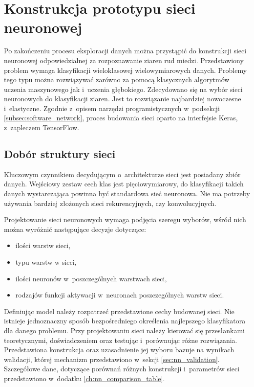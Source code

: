 \section{Konstrukcja prototypu sieci neuronowej}
Po zakończeniu procesu eksploracji danych można przystąpić do
konstrukcji sieci neuronowej odpowiedzialnej za rozpoznawanie ziaren rud
miedzi.
Przedstawiony problem wymaga klasyfikacji wieloklasowej wielowymiarowych
danych.
Problemy tego typu można rozwiązywać zarówno za pomocą klasycznych algorytmów
uczenia maszynowego jak i~uczenia głębokiego.
Zdecydowano się na wybór sieci neuronowych do klasyfikacji ziaren.
Jest to rozwiązanie najbardziej nowoczesne i~elastyczne.
Zgodnie z~opisem narzędzi programistycznych w~podsekcji
\ref{subsec:software_network}, proces budowania sieci oparto na interfejsie
Keras, z~zapleczem TensorFlow.

\subsection{Dobór struktury sieci} \label{subsec:nn_build}
Kluczowym czynnikiem decydującym o~architekturze sieci jest posiadany
zbiór danych.
Wejściowy zestaw cech klas jest pięciowymiarowy, do klasyfikacji takich
danych wystarczająca powinna być standardowa sieć neuronowa.
Nie ma potrzeby używania bardziej złożonych sieci rekurencyjnych, czy
konwolucyjnych.

Projektowanie sieci neuronowych wymaga podjęcia szeregu wyborów, wśród nich
można wyróżnić następujące decyzje dotyczące:
\begin{itemize}
	\item ilości warstw sieci,
	\item typu warstw w sieci,
	\item ilości neuronów w~poszczególnych warstwach sieci,
	\item rodzajów funkcji aktywacji w~neuronach poszczególnych warstw sieci.
\end{itemize}
Definiując model należy rozpatrzeć przedstawione cechy budowanej sieci.
Nie istnieje jednoznaczny sposób bezpośredniego określenia najlepszego
klasyfikatora dla danego problemu.
Przy projektowaniu sieci należy kierować się przesłankami teoretycznymi,
doświadczeniem oraz testując i~porównując różne rozwiązania.
Przedstawiona konstrukcja oraz uzasadnienie jej wyboru bazuje na wynikach
walidacji, której mechanizm przedstawiono w~sekcji \ref{sec:nn_validation}.
Szczegółowe dane, dotyczące porównań różnych konstrukcji i~parametrów
sieci przedstawiono w~dodatku \ref{ch:nn_comparison_table}.

